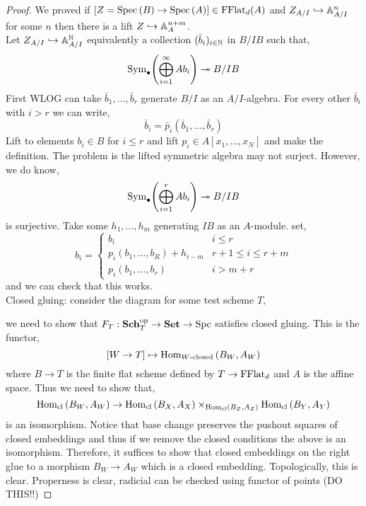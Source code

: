 \documentclass[12pt]{article}
\begin{document}
\begin{proof}
We proved if $[Z = \mathrm{Spec}\left( B \right) \to \mathrm{Spec}\left( A \right)] \in \mathrm{FFlat}_d(A)$ and $Z_{A/I} \hookrightarrow \mathbb{A}^n_{A/I}$ for some $n$ then there is a lift $Z \hookrightarrow \mathbb{A}_{A}^{n+m}$. 
\bigskip\\
Let $Z_{A/I} \hookrightarrow \mathbb{A}^{\mathbb{N}}_{A/I}$ equivalently a collection $(\bar{b}_i)_{i \in \mathbb{N}}$ in $B/IB$ such that,
\[ \mathrm{Sym}_{\bullet}\! \left( \bigoplus_{i = 1}^\infty A b_i \right) \twoheadrightarrow B / I B \]
First WLOG can take $\bar{b}_1, \dots, \bar{b}_r$ generate $B/I$ as an $A/I$-algebra. For every other $\bar{b}_i$ with $i > r$ we can write,
\[ \bar{b}_i = \bar{p}_i(\bar{b}_1, \dots, \bar{b}_r) \]
Lift to elements $b_i \in B$ for $i \le r$ and lift $p_i \in A[x_1, \dots, x_N]$ and make the definition. The problem is the lifted symmetric algebra may not surject. However, we do know,
\[ \mathrm{Sym}_{\bullet}\! \left( \bigoplus_{i = 1}^r A b_i \right) \twoheadrightarrow B / I B \]
is surjective. Take some $h_1, \dots, h_m$ generating $IB$ as an $A$-module. set,
\[ b_i = 
\begin{cases}
b_i & i \le r
\\
p_i(b_1, \dots, b_R) + h_{i-m} & r+1 \le i \le r+ m
\\
p_i(b_1, \dots, b_r) & i > m + r
\end{cases} \]
and we can check that this works. 
\bigskip\\
Closed gluing: consider the diagram for some test scheme $T$,
\begin{center}
\end{center}
we need to show that $F_T : \mathbf{Sch}_T^{\mathrm{op}} \to \mathbf{Set} \to \mathrm{Spc}$ satisfies closed gluing. This is the functor,
\[ [W \to T] \mapsto \mathrm{Hom}_{W\text{-closed}} \left( B_W, A_W \right) \]
where $B \to T$ is the finite flat scheme defined by $T \to \mathrm{FFlat}_d$ and $A$ is the affine space. Thus we need to show that,
\[ \mathrm{Hom}_{\text{cl}} \left( B_W, A_W \right) \to \mathrm{Hom}_{\text{cl}} \left( B_X, A_X \right) \times_{\mathrm{Hom}_{\text{cl}} \left( B_Z, A_Z \right)} \mathrm{Hom}_{\text{cl}} \left( B_Y, A_Y \right) \]
is an isomorphism.
Notice that base change preserves the pushout squares of closed embeddings and thus if we remove the closed conditions the above is an isomorphism. Therefore, it suffices to show that closed embeddings on the right glue to a morphism $B_W \to A_W$ which is a closed embedding. Topologically, this is clear. Properness is clear, radicial can be checked using functor of points (DO THIS!!)
\end{proof}
\end{document}
